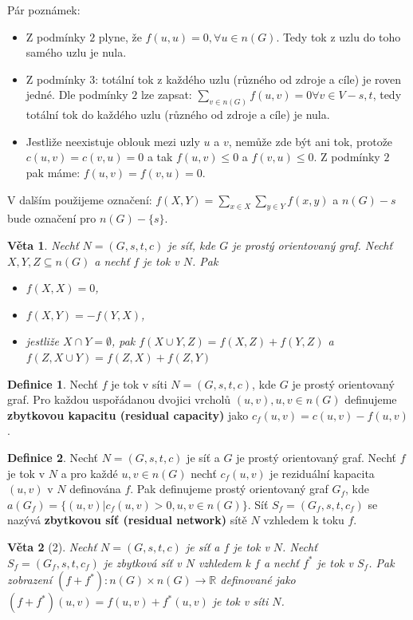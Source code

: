 \documentclass[a4]{report}
\newtheorem{theorem}{Věta}
\theoremstyle{definition}
\newtheorem{definition}{Definice}[section]
\begin{document}
Pár poznámek:
\begin{itemize}
    \item Z podmínky $2$ plyne, že $f(u,u) = 0, \forall u \in n(G)$. Tedy tok z uzlu do toho samého uzlu je nula.
    \item Z podmínky $3$: totální tok z každého uzlu (různého od zdroje a cíle) je roven jedné. Dle podmínky $2$ lze zapsat: $\sum_{v \in n(G)} f(u,v) = 0 \forall v \in V - {s,t}$, tedy totální tok do každého uzlu (různého od zdroje a cíle) je nula.
    \item Jestliže neexistuje oblouk mezi uzly $u$ a $v$, nemůže zde být ani tok, protože $c(u,v) = c(v,u) = 0$ a tak $f(u,v) \leq 0$ a $f(v,u) \leq 0$. Z podmínky $2$ pak máme: $f(u,v) = f(v,u) = 0$.
\end{itemize}

V dalším použijeme označení: $f(X,Y)=\sum\limits_{x\in X}\sum\limits_{y\in Y}f(x,y)$ a $n(G) - s$ bude označení pro $n(G) - \{ s \}$.

\begin{theorem}
Nechť $N = (G,s,t,c)$ je síť, kde $G$ je prostý orientovaný graf. Nechť $X, Y, Z \subseteq n(G)$ a nechť $f$ je tok v $N$. Pak
\begin{itemize}
    \item $f(X,X)=0$,
    \item $f(X,Y)=-f(Y,X)$,
    \item jestliže $X\cap Y=\emptyset$, pak $f(X\cup Y,Z)=f(X,Z)+f(Y,Z)$
a $f(Z,X\cup Y)=f(Z,X)+f(Z,Y)$
\end{itemize}
\end{theorem}

\begin{definition}
Nechť $f$ je tok v síti $N = (G, s, t, c)$, kde $G$ je prostý orientovaný graf. Pro každou uspořádanou dvojici vrcholů $(u,v), u,v \in n(G)$ definujeme \textbf{zbytkovou kapacitu (residual capacity)} jako $c_f (u,v) = c(u,v) - f(u,v)$.
\end{definition}
\begin{definition}
Nechť $N = (G, s, t, c)$ je síť a $G$ je prostý orientovaný graf. Nechť $f$ je tok v $N$ a pro každé $u, v \in n(G)$ nechť $c_f (u,v)$ je reziduální kapacita $(u,v)$ v $N$ definována $f$. Pak definujeme prostý orientovaný graf $G_f$, kde $a(G_f) = \{ (u,v) | c_f (u,v) > 0, u,v \in n(G)\}$. Síť $S_f = (G_f, s, t, c_f)$ se nazývá \textbf{zbytkovou síť (residual network)} sítě $N$ vzhledem k toku $f$.
\end{definition}

\begin{theorem}[2]
Nechť $N = (G,s,t,c)$ je síť a $f$ je tok v $N$. Nechť $S_f = (G_f, s, t, c_f)$ je zbytková síť v $N$ vzhledem k $f$ a nechť $f^*$ je tok v $S_f$. Pak zobrazení $(f+f^*) : n(G) \times n(G) \rightarrow \mathbb{R}$ definované jako $(f+f^*) (u,v) = f(u,v) + f^*(u,v)$ je tok v síti $N$.
\end{theorem}
\end{document}
